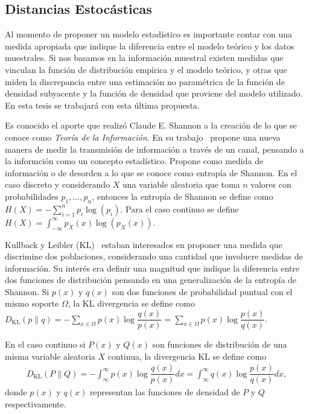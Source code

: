 \subsection{Distancias Estocásticas}

Al momento de proponer un modelo estadístico es importante contar con una medida apropiada que indique la diferencia entre el modelo teórico y los datos muestrales. Si nos basamos en la información muestral existen medidas que vinculan la función de distribución empírica y el modelo teórico, y otras que miden la discrepancia entre una estimación no paramétrica de la función de densidad subyacente y la función de densidad que proviene del modelo utilizado. En esta tesis se trabajará con esta última propuesta.

Es conocido el aporte que realizó Claude E. Shannon a la creaci\'on de lo que se conoce como \textit{Teoría de la Información}. En su trabajo~\cite{Shannon1948} propone una nueva manera de medir la transmisi\'on de informaci\'on a trav\'es de un canal, pensando a la informci\'on como un concepto estad\'istico. Propone como medida de informaci\'on o de desorden a lo que se conoce como entrop\'ia de Shannon. En el caso discreto y considerando $X$ una variable aleatoria que toma $n$ valores con probabilidades $p_1,\ldots,p_n$, entonces la entrop\'ia de Shannon se define como $H(X)=-\sum_{i=1}^n p_i \log(p_i)$. Para el caso continuo se define $H(X)=\int_{-\infty}^{\infty} p_X(x) \log(p_X(x)).$

Kullback y Leibler (KL)~\cite{KullbackLeibler1951} estaban interesados en proponer una medida que discrimine dos poblaciones, considerando una cantidad que involucre medidas de informaci\'on. Su inter\'es era definir una magnitud que indique la diferencia entre dos funciones de distribuci\'on pensando en una generalizaci\'on de la entrop\'ia de Shannon. Si $p(x)$ y $q(x)$ son dos funciones de probabilidad puntual con el mismo soporte $\Omega$, la KL divergencia se define como $D_{\text{KL}}(p \rVert q)=-\sum_{x \in \Omega} p(x) \log \dfrac{q(x)}{p(x)}=\sum_{x \in \Omega} p(x) \log\dfrac{p(x)}{q(x)}$. 

En el caso continuo si $P(x)$ y $Q(x)$ son funciones de distribuci\'on de una misma variable aleatoria $X$ continua, la divergencia KL se define como 
\begin{align}
\label{KL}
D_{\text{KL}}(P \rVert Q)=-\int_{\infty}^{\infty} p(x) \log\dfrac{q(x)}{p(x)} dx=\int_{\infty}^{\infty} q(x) \log\dfrac{p(x)}{q(x)} dx,
\end{align} 
donde $p(x)$ y $q(x)$ representan las funciones de densidad de $P$ y $Q$ respectivamente. 

